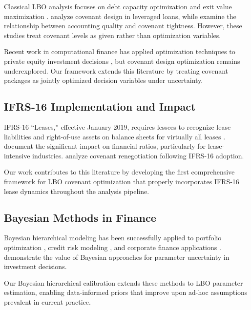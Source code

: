 \documentclass[11pt,a4paper]{article}
\begin{document}
Classical LBO analysis focuses on debt capacity optimization and exit value maximization \citep{kaplan1989effects, axelson2013borrow}. \citet{ivashina2011covenant} analyze covenant design in leveraged loans, while \citet{bharath2008accounting} examine the relationship between accounting quality and covenant tightness. However, these studies treat covenant levels as given rather than optimization variables.

Recent work in computational finance has applied optimization techniques to private equity investment decisions \citep{buchner2017simulation, ang2018alternative}, but covenant design optimization remains underexplored. Our framework extends this literature by treating covenant packages as jointly optimized decision variables under uncertainty.

\subsection{IFRS-16 Implementation and Impact}

IFRS-16 ``Leases,'' effective January 2019, requires lessees to recognize lease liabilities and right-of-use assets on balance sheets for virtually all leases \citep{ifrs2016leases}. \citet{fitó2022ifrs16} document the significant impact on financial ratios, particularly for lease-intensive industries. \citet{grossmann2021ifrs16} analyze covenant renegotiation following IFRS-16 adoption.

Our work contributes to this literature by developing the first comprehensive framework for LBO covenant optimization that properly incorporates IFRS-16 lease dynamics throughout the analysis pipeline.

\subsection{Bayesian Methods in Finance}

Bayesian hierarchical modeling has been successfully applied to portfolio optimization \citep{black1992global}, credit risk modeling \citep{kiefer2003default}, and corporate finance applications \citep{graham2015corporate}. \citet{pastor2000comparing} demonstrate the value of Bayesian approaches for parameter uncertainty in investment decisions.

Our Bayesian hierarchical calibration extends these methods to LBO parameter estimation, enabling data-informed priors that improve upon ad-hoc assumptions prevalent in current practice.
\end{document}
